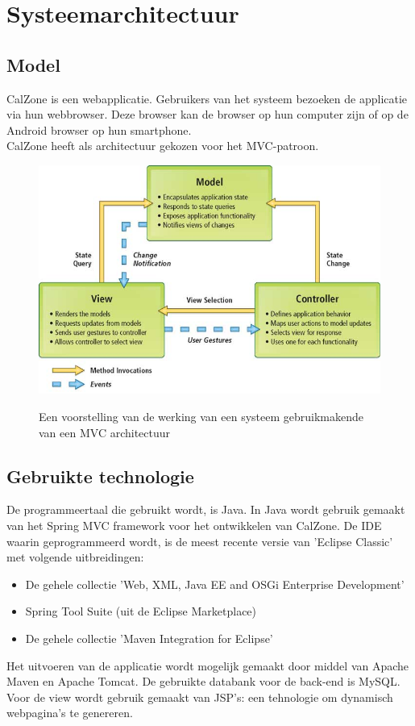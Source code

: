 \chapter{Systeemarchitectuur}
\label{chap:architectuur}

\section{Model}
\label{sec:model}
CalZone is een webapplicatie. Gebruikers van het systeem bezoeken de applicatie via hun webbrowser. Deze browser kan de browser op hun computer  zijn of op de Android browser op hun smartphone.
\\
CalZone heeft als architectuur gekozen voor het MVC-patroon.\cite{mvc}

\begin{figure}[H]
	\centering
	\includegraphics[scale=0.5]{img/mvc.jpg}
	\label{fig:mvc}
	\caption{Een voorstelling van de werking van een systeem gebruikmakende van een MVC architectuur}
\end{figure}

\section{Gebruikte technologie}
\label{sec:technologie}
De programmeertaal die gebruikt wordt, is Java. 
In Java wordt gebruik gemaakt van het Spring MVC framework\cite{spring, spring-mvc} voor het ontwikkelen van CalZone. 
De IDE waarin geprogrammeerd wordt, is de meest recente versie van 'Eclipse Classic' met volgende uitbreidingen:

\begin{itemize}
	\item De gehele collectie 'Web, XML, Java EE and OSGi Enterprise Development'	
	\item Spring Tool Suite (uit de Eclipse Marketplace)
	\item De gehele collectie 'Maven Integration for Eclipse'
\end{itemize}
\noindent
Het uitvoeren van de applicatie wordt mogelijk gemaakt door middel van Apache Maven\cite{Maven} en Apache Tomcat\cite{Tomcat}.
De gebruikte databank voor de back-end is MySQL. 
Voor de view wordt gebruik gemaakt van JSP's: een tehnologie om dynamisch webpagina's te genereren.
